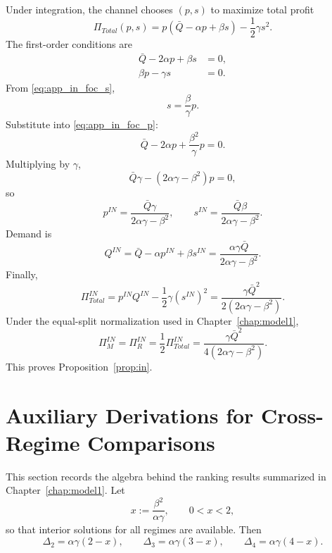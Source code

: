 Under integration, the channel chooses $(p,s)$ to maximize total profit
\begin{equation}
 \Pi_{Total}(p,s)=p(\bar Q-\alpha p+\beta s)-\frac{1}{2}\gamma s^2.
\end{equation}
The first-order conditions are
\begin{align}
 \bar Q-2\alpha p+\beta s&=0,
 \label{eq:app_in_foc_p}\\
 \beta p-\gamma s&=0.
 \label{eq:app_in_foc_s}
\end{align}
From \eqref{eq:app_in_foc_s},
\begin{equation}
 s=\frac{\beta}{\gamma}p.
\end{equation}
Substitute into \eqref{eq:app_in_foc_p}:
\begin{equation}
 \bar Q-2\alpha p+\frac{\beta^2}{\gamma}p=0.
\end{equation}
Multiplying by $\gamma$,
\begin{equation}
 \bar Q\gamma-(2\alpha\gamma-\beta^2)p=0,
\end{equation}
so
\begin{equation}
 p^{IN}=\frac{\bar Q\gamma}{2\alpha\gamma-\beta^2},
 \qquad
 s^{IN}=\frac{\bar Q\beta}{2\alpha\gamma-\beta^2}.
\end{equation}
Demand is
\begin{equation}
 Q^{IN}=\bar Q-\alpha p^{IN}+\beta s^{IN}
 =\frac{\alpha\gamma\bar Q}{2\alpha\gamma-\beta^2}.
\end{equation}
Finally,
\begin{equation}
 \Pi_{Total}^{IN}=p^{IN}Q^{IN}-\frac{1}{2}\gamma(s^{IN})^2
 =\frac{\gamma\bar Q^2}{2(2\alpha\gamma-\beta^2)}.
\end{equation}
Under the equal-split normalization used in Chapter~\ref{chap:model1},
\begin{equation}
 \Pi_M^{IN}=\Pi_R^{IN}=\frac{1}{2}\Pi_{Total}^{IN}
 =\frac{\gamma\bar Q^2}{4(2\alpha\gamma-\beta^2)}.
\end{equation}
This proves Proposition~\ref{prop:in}.

\section{Auxiliary Derivations for Cross-Regime Comparisons}
\label{app:rankings}

This section records the algebra behind the ranking results summarized in
Chapter~\ref{chap:model1}. Let
\begin{equation}
 x:=\frac{\beta^2}{\alpha\gamma},
 \qquad 0<x<2,
\end{equation}
so that interior solutions for all regimes are available. Then
\begin{equation}
 \Delta_2=\alpha\gamma(2-x),
 \qquad
 \Delta_3=\alpha\gamma(3-x),
 \qquad
 \Delta_4=\alpha\gamma(4-x).
\end{equation}

